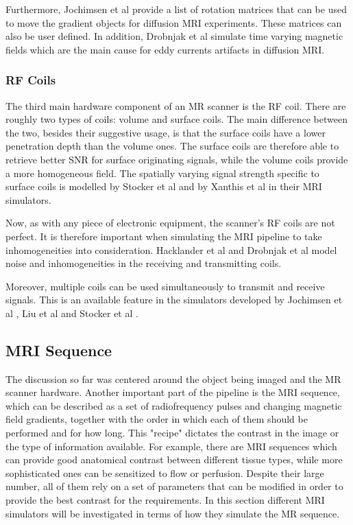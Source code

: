 Furthermore, Jochimsen et al \cite{Jochimsen2004} provide a list of rotation matrices that can be used to move the gradient objects for diffusion MRI experiments. These matrices can also be user defined. In addition, Drobnjak et al \cite{Drobnjak2010} simulate time varying magnetic fields which are the main cause for eddy currents artifacts in diffusion MRI. 

\subsubsection{RF Coils}
The third main hardware component of an MR scanner is the RF coil. There are roughly two types of coils: volume and surface coils. The main difference between the two, besides their suggestive usage, is that the surface coils have a lower penetration depth than the volume ones. The surface coils are therefore able to retrieve better SNR for surface originating signals, while the volume coils provide a more homogeneous field. The spatially varying signal strength specific to surface coils is modelled by Stocker et al \cite{Stocker2010} and by Xanthis et al \cite{Xanthis2014} in their MRI simulators.

Now, as with any piece of electronic equipment, the scanner's RF coils are not perfect. It is therefore important when simulating the MRI pipeline to take inhomogeneities into consideration. Hacklander et al \cite{Hacklander2005} and Drobnjak et al \cite{Drobnjak2006} model noise and inhomogeneities in the receiving and transmitting coils. 

Moreover, multiple coils can be used simultaneously to transmit and receive signals. This is an available feature in the simulators developed by Jochimsen et al \cite{Jochimsen2004}, Liu et al \cite{Liu2014} and Stocker et al \cite{Stocker2010}.

\subsection{MRI Sequence}
The discussion so far was centered around the object being imaged and the MR scanner hardware. Another important part of the pipeline is the MRI sequence, which can be described as a set of radiofrequency pulses and changing magnetic field gradients, together with the order in which each of them should be performed and for how long. This "recipe" dictates the contrast in the image or the type of information available. For example, there are MRI sequences which can provide good anatomical contrast between different tissue types, while more sophisticated ones can be sensitized to flow or perfusion. Despite their large number, all of them rely on a set of parameters that can be modified in order to provide the best contrast for the requirements. 
In this section different MRI simulators will be investigated in terms of how they simulate the MR sequence.

